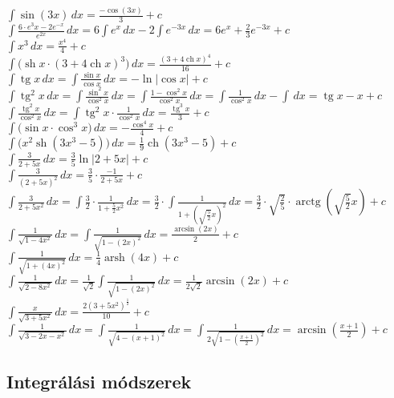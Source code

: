 \documentclass[a4paper,12pt,twoside]{book}
\DeclareMathOperator{\tg}{tg}
\DeclareMathOperator{\arctg}{arctg}
\DeclareMathOperator{\sh}{sh} %
\DeclareMathOperator{\ch}{ch} %
\DeclareMathOperator{\arsh}{arsh}
\theoremstyle{break}
\theoremstyle{plain}
\newcommand{\integ}[1]{\ensuremath{\int #1\, dx}}
\begin{document}
$\displaystyle \integ{\sin(3x)} = \frac{-\cos (3x)}{3}+c$\\
$\displaystyle \integ{\frac{6\cdot e^3x-2e^{-x}}{e^{2x}}} = 6\integ{e^x}-2\integ{e^{-3x}} = 6e^x+\frac{2}{3}e^{-3x}+c$\\
$\displaystyle \integ{x^3} = \frac{x^4}{4} + c$\\
$\displaystyle \integ{\Big(\sh x\cdot (3+4\ch x)^3\Big)} = \frac{(3+4\ch x)^4}{16} + c$\\
$\displaystyle \integ{\tg x} = \integ{\frac{\sin x}{\cos x}} = -\ln|\cos x|+c$\\[+4pt]
$\displaystyle \integ{\tg^2 x} = \integ{\frac{\sin^2 x}{\cos^2 x}} = \integ{\frac{1-\cos^2 x}{\cos^2 x}} = \integ{\frac{1}{\cos^2 x}} - \integ{} = \tg x - x +c$\\[+4pt]
$\displaystyle \integ{\frac{\tg^2 x}{\cos^2 x}} = \integ{\tg^2 x\cdot\frac{1}{\cos^2 x}} = \frac{\tg^3 x}{3} + c$\\
$\displaystyle \integ{\Big(\sin x\cdot \cos^3 x\Big)} = -\frac{\cos^4 x}{4} + c$\\
$\displaystyle \integ{\Big(x^2\sh(3x^3-5)\Big)} = \frac{1}{9}\ch(3x^3-5) + c$\\
$\displaystyle \integ{\frac{3}{2+5x}} = \frac{3}{5}\ln|2+5x| + c$\\[+4pt]
$\displaystyle \integ{\frac{3}{(2+5x)^2}} = \frac{3}{5}\cdot\frac{-1}{2+5x} + c$\\
$\displaystyle \integ{\frac{3}{2+5x^2}} = \integ{\frac{3}{2}\cdot\frac{1}{1+\frac{5}{2}x^2}} = \frac{3}{2}\cdot\integ{\frac{1}{1+\left(\sqrt{\frac{5}{2}}x\right)^2}} = \frac{3}{2}\cdot\sqrt{\frac{2}{5}}\cdot\arctg\left(\sqrt{\frac{5}{2}}x\right) +c$\\[+4pt]
$\displaystyle \integ{\frac{1}{\sqrt{1-4x^2}}} = \integ{\frac{1}{\sqrt{1-(2x)^2}}} = \frac{\arcsin(2x)}{2} + c$\\[+4pt]
$\displaystyle \integ{\frac{1}{\sqrt{1+(4x)^2}}} = \frac{1}{4}\arsh(4x) + c$\\[+4pt]
$\displaystyle \integ{\frac{1}{\sqrt{2-8x^2}}} = \frac{1}{\sqrt{2}}\integ{\frac{1}{\sqrt{1-(2x)^2}}} = \frac{1}{2\sqrt{2}}\arcsin(2x) + c$\\[+4pt]
$\displaystyle \integ{\frac{x}{\sqrt{3+5x^2}}} = \frac{2(3+5x^2)^{\frac{1}{2}}}{10} + c$\\[+4pt]
$\displaystyle \integ{\frac{1}{\sqrt{3-2x-x^2}}} = \integ{\frac{1}{\sqrt{4-(x+1)^2}}} = \integ{\frac{1}{2\sqrt{1-\left(\frac{x+1}{2}\right)^2}}} = \arcsin\left(\frac{x+1}{2}\right)+ c$

\subsection{Integrálási módszerek}
\end{document}
